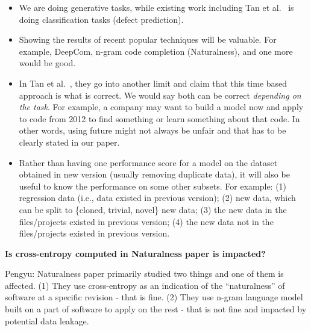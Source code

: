 \begin{itemize}
\item We are doing generative tasks, while existing work including
  Tan et al.~\cite{TanETAL15Online} is doing classification tasks (defect
  prediction).
\item Showing the results of recent popular techniques will be
  valuable.  For example, DeepCom, n-gram code completion
  (Naturalness), and one more would be good.
\item In Tan et al.~\cite{TanETAL15Online}, they go into another limit and claim
  that this time based approach is what is correct.  We would say both
  can be correct \textit{depending on the task}.  For example, a
  company may want to build a model now and apply to code from 2012 to
  find something or learn something about that code.  In other words,
  using future might not always be unfair and that has to be clearly
  stated in our paper.
\item Rather than having one performance score for a model on the
  dataset obtained in new version (usually removing duplicate data),
  it will also be useful to know the performance on some other
  subsets.  For example: (1) regression data (i.e., data existed in
  previous version); (2) new data, which can be split to \{cloned,
  trivial, novel\} new data; (3) the new data in the files/projects
  existed in previous version; (4) the new data not in the
  files/projects existed in previous version.
\end{itemize}

\textbf{Is cross-entropy computed in Naturalness paper is impacted?}

Pengyu: Naturalness paper primarily studied two things and one of them
is affected.  (1) They use cross-entropy as an indication of the
``naturalness'' of software at a specific revision - that is fine.
(2) They use n-gram language model built on a part of software to
apply on the rest - that is not fine and impacted by potential data
leakage.
